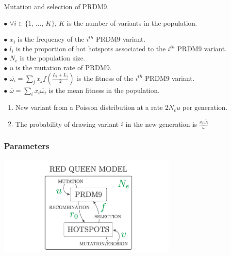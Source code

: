 \documentclass[10pt]{beamer}
\begin{document}
\begin{frame}
	\begin{center}
		\Large
    Mutation and selection of PRDM9.
	\end{center}

		$\bullet$ $\forall i \in \{ 1, \, \dots, \, K \} $, $K$ is the number of variants in the population.
		
	$\bullet$ $x_i$ is the frequency of the $i^{th}$ PRDM9 variant.\\
	
	$\bullet$ $l_i$ is the proportion of hot hotspots associated to the $i^{th}$ PRDM9 variant.\\
	
	$\bullet$ $N_e$ is the population size.\\
	
	$\bullet$ $u$ is the mutation rate of PRDM9.\\

	$\bullet$ $\overline{\omega_i}=\sum_j x_j f \left( \tfrac{L_i + L_j}{2} \right)$ is the fitness of the $i^{th}$ PRDM9 variant.\\
	
	$\bullet$ $\overline{\omega}=\sum_{i} x_i \overline{\omega_i}$ is the mean fitness in the population.\\
		\begin{enumerate}
	\item New variant from a Poisson distribution at a rate $ 2 N_e u $ per generation. \\
	\item The probability of drawing variant $i$ in the new generation is $ \tfrac{x_i \overline{\omega_i}}{\overline{\omega}} $
		\end{enumerate}
\end{frame}

\begin{frame}
	\frametitle{Parameters}
	\begin{center}
       \includegraphics[width=9cm]{Images/red-queen-model.jpg}
	\end{center}
\end{frame}
\end{document}

